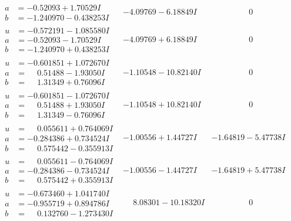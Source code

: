 \documentclass[1p]{elsarticle_modified}
\theoremstyle{definition}
\begin{document}
$$\begin{array}{c|c|c}
\begin{aligned}
a &= -0.52093 + 1.70529 I \\
b &= -1.240970 - 0.438253 I\end{aligned}
 & -4.09769 - 6.18849 I & \phantom{-0.000000 } 0 \\ \hline\begin{aligned}
u &= -0.572191 - 1.085580 I \\
a &= -0.52093 - 1.70529 I \\
b &= -1.240970 + 0.438253 I\end{aligned}
 & -4.09769 + 6.18849 I & \phantom{-0.000000 } 0 \\ \hline\begin{aligned}
u &= -0.601851 + 1.072670 I \\
a &= \phantom{-}0.51488 - 1.93050 I \\
b &= \phantom{-}1.31349 + 0.76096 I\end{aligned}
 & -1.10548 - 10.82140 I & \phantom{-0.000000 } 0 \\ \hline\begin{aligned}
u &= -0.601851 - 1.072670 I \\
a &= \phantom{-}0.51488 + 1.93050 I \\
b &= \phantom{-}1.31349 - 0.76096 I\end{aligned}
 & -1.10548 + 10.82140 I & \phantom{-0.000000 } 0 \\ \hline\begin{aligned}
u &= \phantom{-}0.055611 + 0.764069 I \\
a &= -0.284386 + 0.734524 I \\
b &= \phantom{-}0.575442 - 0.355913 I\end{aligned}
 & -1.00556 + 1.44727 I & -1.64819 - 5.47738 I \\ \hline\begin{aligned}
u &= \phantom{-}0.055611 - 0.764069 I \\
a &= -0.284386 - 0.734524 I \\
b &= \phantom{-}0.575442 + 0.355913 I\end{aligned}
 & -1.00556 - 1.44727 I & -1.64819 + 5.47738 I \\ \hline\begin{aligned}
u &= -0.673460 + 1.041740 I \\
a &= -0.955719 + 0.894786 I \\
b &= \phantom{-}0.132760 - 1.273430 I\end{aligned}
 & \phantom{-}8.08301 - 10.18320 I & \phantom{-0.000000 } 0 \\ \hline\begin{aligned}

\end{aligned}
\end{array}$$
\end{document}
